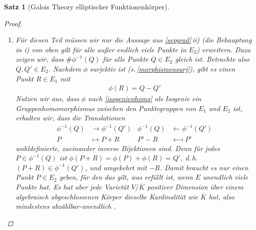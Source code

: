 \documentclass[english, german, parskip=half]{scrartcl}
\newtheorem{Satz}{Satz}[section]
\theoremstyle{definition}
\theoremstyle{remark}
\newcommand*{\algK}{\ensuremath{\overline K}} %
\newcommand*{\longto}{\longrightarrow}
\newcommand*{\longfrom}{\longleftarrow}
\begin{document}
\begin{Satz}[Galois Theory elliptischer Funktionenkörper]
\begin{proof}~
  \begin{enumerate}[label=\roman*)]
  \item Für diesen Teil müssen wir nur die Aussage aus
    \autoref{sepgrad}\,ii) (die Behauptung in \emph{i)} von oben gilt
    für alle außer endlich viele Punkte in $E_2$) erweitern. Dazu
    zeigen wir, dass $\#\phi^{-1}(Q)$ für alle Punkte $Q\in E_2$
    gleich ist. 
    Betrachte also $Q,Q'\in E_2$. Nachdem $\phi$ surjektiv ist
    (s.\,\autoref{morphismensurj}), gibt es einen Punkt $R\in E_1$ mit
    \begin{gather*}
      \phi(R) = Q - Q'
    \end{gather*}
    Nutzen wir aus, dass $\phi$  nach \autoref{isogenienhoms} als
    Isogenie ein Gruppenhomomorphismus zwischen den Punktegruppen von
    $E_1$ und $E_2$ ist, erhalten wir, dass die Translationen
    \begin{align*}
      \phi^{-1}(Q) &\longto \phi^{-1}(Q')
      &\phi^{-1}(Q) &\longfrom \phi^{-1}(Q')\\
      P &\longmapsto P+R
      &P'-R &\longmapsfrom P'
    \end{align*}
    wohldefinierte, zueinander inverse Bijektionen sind.
    Denn für jedes $P\in\phi^{-1}(Q)$ ist
    $\phi(P+R)=\phi(P)+\phi(R)=Q'$, d.\,h. $(P+R)\in\phi^{-1}(Q')$,
    und umgekehrt mit $-R$.
    Damit braucht es nur einen Punkt $P\in E_2$ geben, für den das
    gilt, was erfüllt ist, wenn $E$ unendlich viele Punkte hat.
    Es hat aber jede Varietät $V/\algK$ positiver Dimension
    über einem algebraisch abgeschlossenen Körper dieselbe
    Kardinalität wie $\algK$ hat, also mindestens abzählbar-unendlich
    \cite[siehe][Exercise I.4.8 oder Section I.6]{hartshorne}.
    

\end{enumerate}
\end{proof}
\end{Satz}
\end{document}
